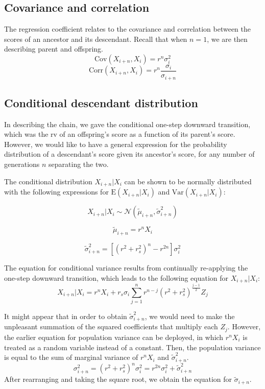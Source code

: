 \documentclass[letterpaper,10pt]{article} %
\begin{document}
\subsection{Covariance and correlation}
The regression coefficient relates to the covariance and correlation between the scores of an ancestor and its descendant. Recall that when $n = 1$, we are then describing parent and offspring. 
$$\mathrm{Cov}(X_{i+n}, X_i) = r^n \sigma_i^2$$
$$\mathrm{Corr}(X_{i+n}, X_i) = r^n \frac{\sigma_i}{\sigma_{i+n}}$$






\subsection{Conditional descendant distribution}

In describing the chain, we gave the conditional one-step downward transition, which was the rv of an offspring's score as a function of its parent's score. However, we would like to have a general expression for the probability distribution of  a descendant's score given its ancestor's score, for any number of generations $n$ separating the two. 

The conditional distribution $X_{i+n}|X_i$ can be shown to be normally distributed with the following expressions for $\mathrm{E}(X_{i+n}|X_i)$ and $\mathrm{Var}(X_{i+n}|X_i)$:

$$X_{i+n}|X_i \sim \mathcal{N}( \tilde{\mu}_{i+n}, \tilde{\sigma}_{i+n}^2)$$

$$\tilde{\mu}_{i+n} = r^nX_i$$

$$\tilde{\sigma}_{i+n}^2 = [(r^2+r_s^2)^n-r^{2n}] \sigma_i^2$$

The equation for conditional variance results from continually re-applying the one-step downward transition, which leads to the following equation for $X_{i+n}|X_i$:
$$X_{i+n}|X_i = r^nX_i + r_s\sigma_i \sum_{j=1}^{n}r^{n-j}(r^2+r_s^2)^{\frac{j-1}{2}}Z_j$$

It might appear that in order to obtain $\tilde{\sigma}_{i+n}^2$, we would need to make the unpleasant summation of the squared coefficients that multiply each $Z_j$. However, the earlier equation for population variance can be deployed, in which $r^nX_i$ is treated as a random variable instead of a constant. Then, the population variance is equal to the sum of marginal variance of $r^nX_i$ and $\tilde{\sigma}_{i+n}^2$.
%
$$\sigma_{i+n}^2 =  (r^2+r_s^2)^n  \sigma_{i}^2 =  r^{2n}\sigma_i^2 + \tilde{\sigma}_{i+n}^2$$
%
After rearranging and taking the square root, we obtain the equation for $\tilde{\sigma}_{i+n}$.
\end{document}
